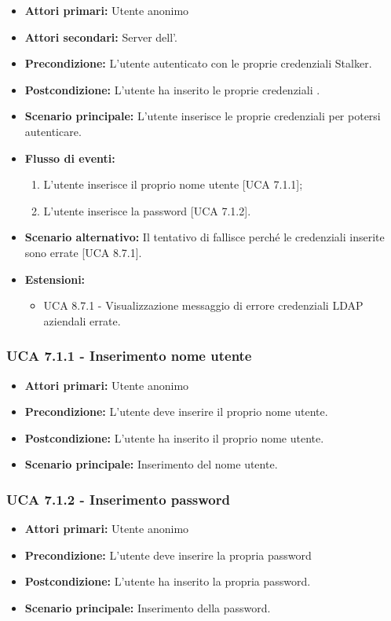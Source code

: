 \begin{itemize}
	\item \textbf{Attori primari:} Utente anonimo 
	\item \textbf{Attori secondari:} Server  dell'.
	\item \textbf{Precondizione:} L'utente  autenticato con le proprie credenziali Stalker.
	\item \textbf{Postcondizione:} L'utente ha inserito le proprie credenziali .
	\item \textbf{Scenario principale:} L'utente inserisce le proprie credenziali  per potersi autenticare.
	\item \textbf{Flusso di eventi:}
	\begin{enumerate}
		\item L'utente inserisce il proprio nome utente [UCA 7.1.1];
		\item L'utente inserisce la password [UCA 7.1.2].
	\end{enumerate}
	\item \textbf{Scenario alternativo:} Il tentativo di  fallisce perché le credenziali inserite sono errate [UCA 8.7.1].
	\item \textbf{Estensioni:}
	\begin{itemize}
		\item UCA 8.7.1 - Visualizzazione messaggio di errore credenziali LDAP aziendali errate.
	\end{itemize}
\end{itemize}

\subsubsection{UCA 7.1.1 - Inserimento nome utente}%
\begin{itemize}
	\item \textbf{Attori primari:} Utente anonimo
	\item \textbf{Precondizione:} L'utente deve inserire il proprio nome utente.
	\item \textbf{Postcondizione:} L'utente ha inserito il proprio nome utente.
	\item \textbf{Scenario principale:} Inserimento del nome utente.
\end{itemize}

\subsubsection{UCA 7.1.2 - Inserimento password}%
\begin{itemize}
	\item \textbf{Attori primari:} Utente anonimo
	\item \textbf{Precondizione:} L'utente deve inserire la propria password
	\item \textbf{Postcondizione:} L'utente ha inserito la propria password.
	\item \textbf{Scenario principale:} Inserimento della password.
\end{itemize}
